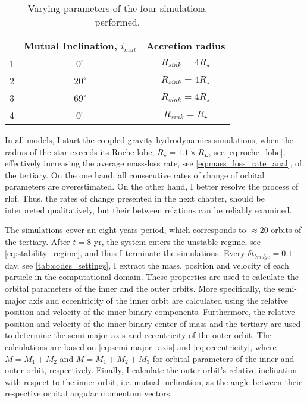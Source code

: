 
\begin{table}[H]
    \centering
    \begin{tabular}{| c | c | c |}
     \hline
     &Mutual Inclination, $i_{mut}$ & Accretion radius \\
    \hline
     1&$0^{\circ}$ & $R_{sink} = 4R_{\star}$\\
     2&$20^{\circ}$ & $R_{sink} = 4R_{\star}$ \\
     3&$69^{\circ}$ & $R_{sink} = 4R_{\star}$ \\
     \hline
     4&$0^{\circ}$ & $R_{sink} = R_{\star}$ \\
     \hline
    \end{tabular}
    \caption{ Varying parameters of the four simulations performed.}
\label{tab:simulations_settings}
\end{table}
In all models, I start the coupled gravity-hydrodynamics simulations, when the radius of the star exceeds its Roche lobe, $R_{\star} = 1.1 \times R_L$, see \cref{eq:roche_lobe}, effectively increasing the average mass-loss rate, see \cref{eq:mass_loss_rate_anal}, of the tertiary. On the one hand, all consecutive rates of change of orbital parameters are overestimated. On the other hand, I better resolve the process of \ac{rlof}. Thus, the rates of change presented in the next chapter, should be interpreted qualitatively, but their between relations can be reliably examined.

The simulations cover an eight-years period, which corresponds to $\approx 20$ orbits of the tertiary. After $t=8$ yr, the system enters the unstable regime, see \cref{eq:stability_regime}, and thus I terminate the simulations. Every $\delta t_{bridge}=0.1$ day, see \cref{tab:codes_settings}, I extract the mass, position and velocity of each particle in the computational domain. These properties are used to calculate the orbital parameters of the inner and the outer orbits. More specifically, the semi-major axis and eccentricity of the inner orbit are calculated using the relative position and velocity of the inner binary components. Furthermore, the relative position and velocity of the inner binary center of mass and the tertiary are used to determine the semi-major axis and eccentricity of the outer orbit. The calculations are based on \cref{eq:semi-major_axis} and \cref{eq:eccentricity}, where $M = M_1 + M_2$ and $M = M_1 + M_2 + M_3$ for orbital parameters of the inner and outer orbit, respectively. Finally, I calculate the outer orbit's relative inclination with respect to the inner orbit, i.e. mutual inclination, as the angle between their respective orbital angular momentum vectors.